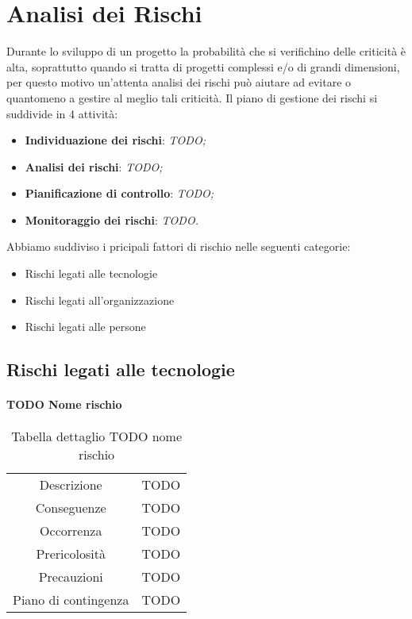 \section{Analisi dei Rischi}
Durante lo sviluppo di un progetto la probabilità che si verifichino delle criticità è alta, 
soprattutto quando si tratta di progetti complessi e/o di grandi dimensioni, per questo motivo
un'attenta analisi dei rischi può aiutare ad evitare o quantomeno a gestire al meglio tali criticità.
Il piano di gestione dei rischi si suddivide in 4 attività:
\begin{itemize}
    \item \textbf{Individuazione dei rischi}: \textit{TODO;}
    \item \textbf{Analisi dei rischi}: \textit{TODO;}
    \item \textbf{Pianificazione di controllo}: \textit{TODO;}
    \item \textbf{Monitoraggio dei rischi}: \textit{TODO.}
\end{itemize}
Abbiamo suddiviso i pricipali fattori di rischio nelle seguenti categorie:
\begin{itemize}
    \item Rischi legati alle tecnologie
    \item Rischi legati all’organizzazione
    \item Rischi legati alle persone
\end{itemize}

\subsection{Rischi legati alle tecnologie}

\paragraph{TODO Nome rischio}
\renewcommand{\arraystretch}{1}
	\begin{table}[H]
		\begin{center}
			\setlength{\aboverulesep}{0pt}
			\setlength{\belowrulesep}{0pt}
			\setlength{\extrarowheight}{.75ex}
			\begin{tabular}{ c c }
				\rowcolor{AzzuroGruppo!30} 
                \toprule
                Descrizione & TODO \\
				Conseguenze & TODO \\
                Occorrenza & TODO \\
                Prericolosità & TODO \\
                Precauzioni & TODO \\
                Piano di contingenza & TODO \\
				\bottomrule
			\end{tabular}
			\caption{Tabella dettaglio TODO nome rischio}
		\end{center}
    \end{table}

